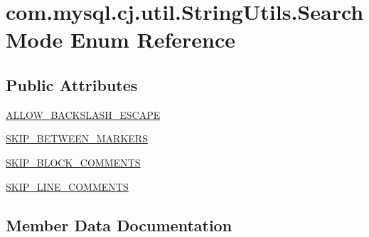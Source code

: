 \hypertarget{enumcom_1_1mysql_1_1cj_1_1util_1_1_string_utils_1_1_search_mode}{}\section{com.\+mysql.\+cj.\+util.\+String\+Utils.\+Search\+Mode Enum Reference}
\label{enumcom_1_1mysql_1_1cj_1_1util_1_1_string_utils_1_1_search_mode}
\subsection*{Public Attributes}
\begin{DoxyCompactItemize}
\item 
\mbox{\hyperlink{enumcom_1_1mysql_1_1cj_1_1util_1_1_string_utils_1_1_search_mode_a8a656e8349bbc3457389cf49048fdf74}{A\+L\+L\+O\+W\+\_\+\+B\+A\+C\+K\+S\+L\+A\+S\+H\+\_\+\+E\+S\+C\+A\+PE}}
\item 
\mbox{\hyperlink{enumcom_1_1mysql_1_1cj_1_1util_1_1_string_utils_1_1_search_mode_afc24d2831de3fa5545c66efba6bf712c}{S\+K\+I\+P\+\_\+\+B\+E\+T\+W\+E\+E\+N\+\_\+\+M\+A\+R\+K\+E\+RS}}
\item 
\mbox{\hyperlink{enumcom_1_1mysql_1_1cj_1_1util_1_1_string_utils_1_1_search_mode_a80b25fe71d131591085ac2252b7207c5}{S\+K\+I\+P\+\_\+\+B\+L\+O\+C\+K\+\_\+\+C\+O\+M\+M\+E\+N\+TS}}
\item 
\mbox{\hyperlink{enumcom_1_1mysql_1_1cj_1_1util_1_1_string_utils_1_1_search_mode_a24cc55f3ffd58efcad919bfc80950cb3}{S\+K\+I\+P\+\_\+\+L\+I\+N\+E\+\_\+\+C\+O\+M\+M\+E\+N\+TS}}
\end{DoxyCompactItemize}


\subsection{Member Data Documentation}
\mbox{\label{enumcom_1_1mysql_1_1cj_1_1util_1_1_string_utils_1_1_search_mode_a8a656e8349bbc3457389cf49048fdf74}} 
